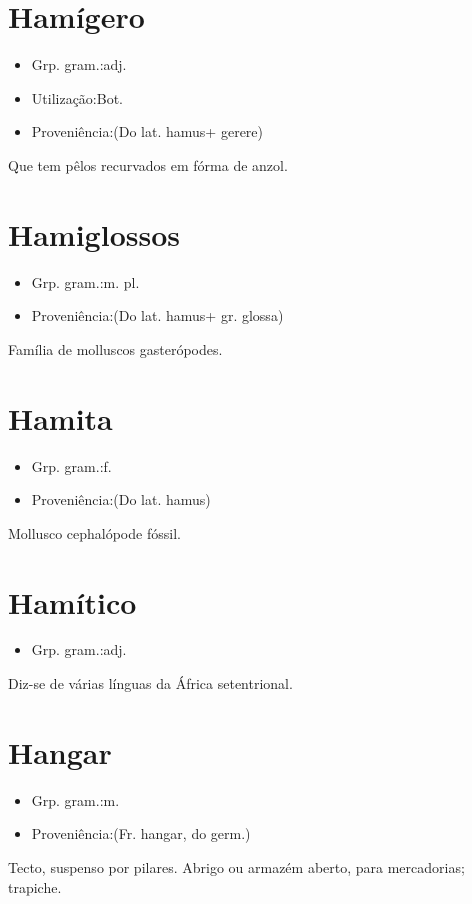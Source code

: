 \documentclass{article}
\begin{document}
\section{Hamígero}
\begin{itemize}
\item {Grp. gram.:adj.}
\end{itemize}
\begin{itemize}
\item {Utilização:Bot.}
\end{itemize}
\begin{itemize}
\item {Proveniência:(Do lat. \textunderscore hamus\textunderscore  + \textunderscore gerere\textunderscore )}
\end{itemize}
Que tem pêlos recurvados em fórma de anzol.
\section{Hamiglossos}
\begin{itemize}
\item {Grp. gram.:m. pl.}
\end{itemize}
\begin{itemize}
\item {Proveniência:(Do lat. \textunderscore hamus\textunderscore  + gr. \textunderscore glossa\textunderscore )}
\end{itemize}
Família de molluscos gasterópodes.
\section{Hamita}
\begin{itemize}
\item {Grp. gram.:f.}
\end{itemize}
\begin{itemize}
\item {Proveniência:(Do lat. \textunderscore hamus\textunderscore )}
\end{itemize}
Mollusco cephalópode fóssil.
\section{Hamítico}
\begin{itemize}
\item {Grp. gram.:adj.}
\end{itemize}
Diz-se de várias línguas da África setentrional.
\section{Hangar}
\begin{itemize}
\item {Grp. gram.:m.}
\end{itemize}
\begin{itemize}
\item {Proveniência:(Fr. \textunderscore hangar\textunderscore , do germ.)}
\end{itemize}
Tecto, suspenso por pilares.
Abrigo ou armazém aberto, para mercadorias; trapiche.
\end{document}
